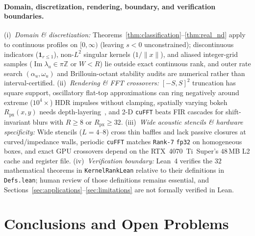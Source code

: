 \documentclass[11pt,a4paper]{article}
\theoremstyle{plain}
\theoremstyle{definition}
\DeclareMathOperator{\ImPart}{Im}
\begin{document}
\paragraph{Domain, discretization, rendering, boundary, and verification boundaries.}
(i)~\emph{Domain \& discretization:} Theorems~\ref{thm:classification}--\ref{thm:real_nd} apply to continuous profiles on $[0,\infty)$ (leaving $s < 0$ unconstrained); discontinuous indicators ($\mathbf{1}_{r \le 1}$), non-$L^2$ singular kernels ($1/\|x\|$), and aliased integer-grid samples ($\ImPart\lambda_u \in \pi\mathbb{Z}$ or $W < R$) lie outside exact continuous rank, and outer rate search $(\alpha_u, \omega_u)$ and Brillouin-octant stability audits are numerical rather than interval-certified. (ii)~\emph{Rendering \& FFT crossovers:} $[-S, S]^2$ truncation has square support, oscillatory flat-top approximations can ring negatively around extreme ($10^4\times$) HDR impulses without clamping, spatially varying bokeh $R_{\mathrm{px}}(x,y)$ needs depth-layering~\cite{garcia2017circular}, and 2-D \texttt{cuFFT} beats FIR cascades for shift-invariant blurs with $R \ge 8$ or $R_{\mathrm{px}} \ge 32$. (iii)~\emph{Wide acoustic stencils \& hardware specificity:} Wide stencils ($L = 4\text{--}8$) cross thin baffles and lack passive closures at curved/impedance walls, periodic \texttt{cuFFT} matches \texttt{Rank-7} \texttt{fp32} on homogeneous boxes, and exact GPU crossovers depend on the RTX~4070~Ti~Super's $48$\,MB L2 cache and register file. (iv)~\emph{Verification boundary:} Lean~4 verifies the $32$ mathematical theorems in \texttt{KernelRankLean} relative to their definitions in \texttt{Defs.lean}; human review of those definitions remains essential, and Sections~\ref{sec:applications}--\ref{sec:limitations} are not formally verified in Lean.

\section{Conclusions and Open Problems}\label{sec:conclusions}
\end{document}
